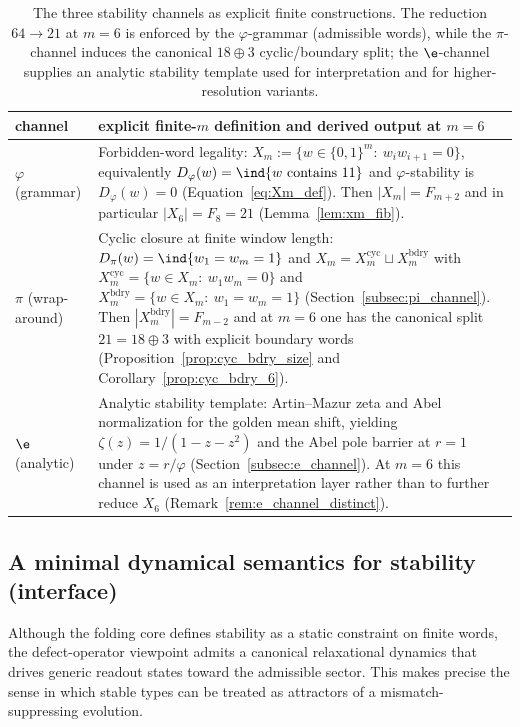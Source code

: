 \begin{table}[t]
\centering
\scriptsize
\setlength{\tabcolsep}{6pt}
\renewcommand{\arraystretch}{1.15}
\begin{tabular}{p{} p{}}
\toprule
channel & explicit finite-$m$ definition and derived output at $m=6$ \\
\midrule
$\varphi$ (grammar) &
Forbidden-word legality: $X_m:=\{w\in\{0,1\}^m:\ w_iw_{i+1}=0\}$, equivalently $D_\varphi(w)=\ind\{w\text{ contains }11\}$ and $\varphi$-stability is $D_\varphi(w)=0$ (Equation~\eqref{eq:Xm_def}).
Then $|X_m|=F_{m+2}$ and in particular $|X_6|=F_8=21$ (Lemma~\ref{lem:xm_fib}).\\
$\pi$ (wrap-around) &
Cyclic closure at finite window length: $D_\pi(w)=\ind\{w_1=w_m=1\}$ and $X_m=X_m^{\mathrm{cyc}}\sqcup X_m^{\mathrm{bdry}}$ with
$X_m^{\mathrm{cyc}}=\{w\in X_m:\ w_1w_m=0\}$ and $X_m^{\mathrm{bdry}}=\{w\in X_m:\ w_1=w_m=1\}$ (Section~\ref{subsec:pi_channel}).
Then $|X_m^{\mathrm{bdry}}|=F_{m-2}$ and at $m=6$ one has the canonical split $21=18\oplus 3$ with explicit boundary words (Proposition~\ref{prop:cyc_bdry_size} and Corollary~\ref{prop:cyc_bdry_6}).\\
$\e$ (analytic) &
Analytic stability template: Artin--Mazur zeta and Abel normalization for the golden mean shift, yielding $\zeta(z)=1/(1-z-z^2)$ and the Abel pole barrier at $r=1$ under $z=r/\varphi$ (Section~\ref{subsec:e_channel}).
At $m=6$ this channel is used as an interpretation layer rather than to further reduce $X_6$ (Remark~\ref{rem:e_channel_distinct}).\\
\bottomrule
\end{tabular}
\caption{The three stability channels as explicit finite constructions. The reduction $64\to 21$ at $m=6$ is enforced by the $\varphi$-grammar (admissible words), while the $\pi$-channel induces the canonical $18\oplus 3$ cyclic/boundary split; the $\e$-channel supplies an analytic stability template used for interpretation and for higher-resolution variants.}
\label{tab:three_channels_definitions}
\end{table}

\subsection{A minimal dynamical semantics for stability (interface)}
\label{subsec:stability_dynamics}

Although the folding core defines stability as a static constraint on finite words, the defect-operator viewpoint admits a canonical relaxational dynamics that drives generic readout states toward the admissible sector.
This makes precise the sense in which stable types can be treated as attractors of a mismatch-suppressing evolution.

